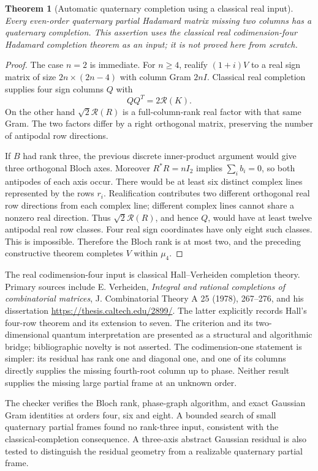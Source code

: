 \documentclass[11pt]{article}
\newtheorem{theorem}{Theorem}[section]
\begin{document}
\begin{theorem}[Automatic quaternary completion using a classical real input]
Every even-order quaternary partial Hadamard matrix missing two
columns has a quaternary completion.
This assertion uses the classical real codimension-four Hadamard
completion theorem as an input; it is not proved here from scratch.
\end{theorem}
\begin{proof}
The case $n=2$ is immediate. For $n\ge4$, realify $(1+i)V$ to a
real sign matrix of size $2n\times(2n-4)$ with column Gram $2nI$.
Classical real completion supplies four sign columns $Q$ with
\[
 QQ^T=2\mathcal R(K).
\]
On the other hand $\sqrt2\mathcal R(R)$ is a full-column-rank real
factor with that same Gram. The two factors differ by a right
orthogonal matrix, preserving the number of antipodal row directions.

If $B$ had rank three, the previous discrete inner-product argument
would give three orthogonal Bloch axes. Moreover $R^*R=nI_2$
implies $\sum_i b_i=0$, so both antipodes of each axis occur.
There would be at least six distinct complex lines represented by
the rows $r_i$. Realification contributes two different orthogonal
real row directions from each complex line; different complex lines
cannot share a nonzero real direction. Thus
$\sqrt2\mathcal R(R)$, and hence $Q$, would have at least twelve
antipodal real row classes. Four real sign coordinates have only
eight such classes. This is impossible. Therefore the Bloch rank is
at most two, and the preceding constructive theorem completes $V$
within $\mu_4$.
\end{proof}

The real codimension-four input is classical Hall--Verheiden
completion theory. Primary sources include E. Verheiden,
\emph{Integral and rational completions of combinatorial matrices},
J. Combinatorial Theory A 25 (1978), 267--276, and his dissertation
\url{https://thesis.caltech.edu/2899/}. The latter explicitly records
Hall's four-row theorem and its extension to seven. The criterion
and its two-dimensional quantum interpretation are presented as a
structural and algorithmic bridge; bibliographic novelty is not asserted.
The codimension-one statement is simpler: its residual has rank one
and diagonal one, and one of its columns directly supplies the
missing fourth-root column up to phase. Neither result supplies
the missing large partial frame at an unknown order.

The checker verifies the Bloch rank, phase-graph algorithm, and exact
Gaussian Gram identities at orders four, six and eight. A bounded
search of small quaternary partial frames found no rank-three input,
consistent with the classical-completion consequence. A three-axis
abstract Gaussian residual is also tested to distinguish the
residual geometry from a realizable quaternary partial frame.
\end{document}
